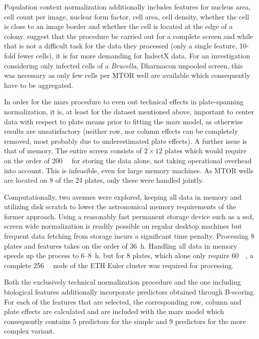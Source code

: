 Population context normalization additionally includes features for nucleus area, cell count per image, nuclear form factor, cell area, cell density, whether the cell is close to an image border and whether the cell is located at the edge of a colony. \citeauthor{Knapp2011} suggest that the procedure be carried out for a complete screen and while that is not a difficult task for the data they processed (only a single feature, 10-fold fewer cells), it is far more demanding for IndectX data. For an investigation considering only infected cells of a \textit{Brucella}, Dharmacon unpooled screen, this was necessary as only few cells per MTOR well are available which consequently have to be aggregated.

In order for the \gls{mars} procedure to even out technical effects in plate-spanning normalization, it is, at least for the dataset mentioned above, important to center data with respect to plate means prior to fitting the \gls{mars} model, as otherwise results are unsatisfactory (neither row, nor column effects can be completely removed, most probably due to underestimated plate effects). A further issue is that of memory. The entire screen consists of $2 \times 12$ plates which would require on the order of \SI{200}{\giga\byte} for storing the data alone, not taking operational overhead into account. This is infeasible, even for large memory machines. As MTOR wells are located on 8 of the 24 plates, only these were handled jointly.

Computationally, two avenues were explored, keeping all data in memory and utilizing disk scratch to lower the astronomical memory requirements of the former approach. Using a reasonably fast permanent storage device such as a \gls{ssd}, screen wide normalization is readily possible on regular desktop machines but frequent data fetching from storage incurs a significant time penalty. Processing 8 plates and  features takes on the order of \SI{36}{\hour}. Handling all data in memory speeds up the process to 6--\SI{8}{\hour}, but for 8 plates, which alone only require \tilde \SI{60}{\giga\byte}, a complete \SI{256}{\giga\byte} node of the ETH Euler cluster was required for processing.

Both the exclusively technical normalization procedure and the one including biological features additionally incorporate predictors obtained through B-scoring. For each of the features that are selected, the corresponding row, column and plate effects are calculated and are included with the mars model which consequently contains 5 predictors for the simple and 9 predictors for the more complex variant.

